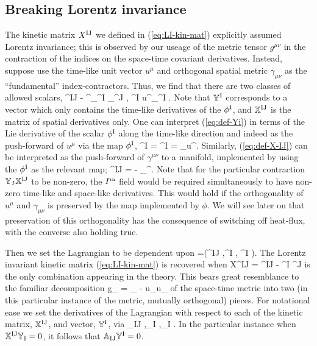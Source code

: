 \documentclass[amsmath,amssymb,12pt,eqsecnum]{article}
\newcommand{\fiu}[2]{#1^{\scriptsize\rm #2 }}
\newcommand{\fid}[2]{#1_{\rm #2 }}
\begin{document}
\subsection{Breaking Lorentz invariance}
The kinetic matrix $\fiu{X}{IJ}$ we defined in (\ref{eq:LI-kin-mat}) explicitly assumed  Lorentz invariance; this is observed by our useage of the metric tensor $g^{\mu\nu}$ in the contraction of the indices on the space-time covariant derivatives. Instead, suppose use the time-like unit vector $u^{\mu}$ and orthogonal spatial metric $\gamma_{\mu\nu}$ as the ``fundamental'' index-contractors. Thus, we find that there are two classes of allowed scalars,
\bse
\bea
\label{eq:def-X-IJ}
\fiu{}{IJ}  -  \gamma^{\mu\nu}\nabla_{\mu}\fiu{\phi}{I} \nabla_{\nu}\fiu{\phi}{J},
\eea
\bea
\label{eq:def-Yi}
\fiu{}{I}  {} u^{\mu}\nabla_{\mu}\fiu{\phi}{I}.
\eea
\ese
Note that $\fiu{\mathbb{Y}}{I}$ corresponds to a vector which only contains the time-like derivatives of the $\fiu{\phi}{I}$, and $\fiu{\mathbb{X}}{IJ}$ is the matrix of spatial derivatives only. One can  interpret (\ref{eq:def-Yi}) in terms of the Lie derivative of the scalar $\fiu{\phi}{I}$ along the time-like direction and indeed as the push-forward of $u^{\mu}$ via the map $\fiu{\phi}{I}$,
\bea
\fiu{}{I} =  \fiu{\phi}{I} =    \phi_{\star}u^{\mu}.
\eea
Similarly, (\ref{eq:def-X-IJ}) can be interpreted as the push-forward of $\gamma^{\mu\nu}$ to a manifold, implemented by using the $\fiu{\phi}{I}$ as the relevant map;
\bea
\fiu{}{IJ} = -  \phi_{\star}\gamma^{\mu\nu}.
\eea
Note that for the particular contraction $\mathbb{Y}_I\fiu{\mathbb{X}}{IJ}$ to be non-zero, the ${I}^{\scriptscriptstyle\textrm{th}}$ field would be required simultaneously to have non-zero time-like and  space-like derivatives.  This would hold if the orthogonality of $u^{\mu}$ and $\gamma_{\mu\nu}$ is preserved by the map implemented by $\phi$. We will see later on that preservation of this orthogonality has the consequence of switching off heat-flux, with the converse also holding true.

Then we set the Lagrangian to be dependent upon
\bea
\label{LV-lag}
\ld =\ld \left(\fiu{}{IJ} ,\fiu{}{I} , \fiu{\phi}{I} \right).
\eea
The Lorentz invariant kinetic matrix (\ref{eq:LI-kin-mat}) is recovered when
\bea
\fiu{X}{IJ} = \fiu{}{IJ}- \fiu{}{I} \fiu{\mathbb{Y}}{J}
\eea
is the only combination appearing in the theory. This bears great resemblance to the familiar decomposition
\bea
g_{\mu\nu} = \gamma_{\mu\nu} - u_{\mu}u_{\nu}
\eea
of the space-time metric into two (in this particular instance of the metric, mutually orthogonal) pieces. For notational ease we set the derivatives of the Lagrangian with respect to each of the kinetic matrix, $\fiu{\mathbb{X}}{IJ}$, and vector, $\fiu{\mathbb{Y}}{I}$, via 
\bea
\label{eq:sec:A-scr-defn}
\fid{}{IJ}   \pd{\ld}{\fiu{\mathbb{X}}{IJ} },\qquad \fid{}{I}    \pd{\ld}{\fiu{\mathbb{Y}}{I}},\qquad \fid{}{I}    \pd{\ld}{\fiu{\phi}{I}}.
\eea
In the particular instance when $\fiu{\mathbb{X}}{IJ}\fid{\mathbb{Y}}{I}=0$, it follows that $\fid{\mathbb{A}}{IJ}\fiu{\mathbb{Y}}{I}=0$.
\end{document}
